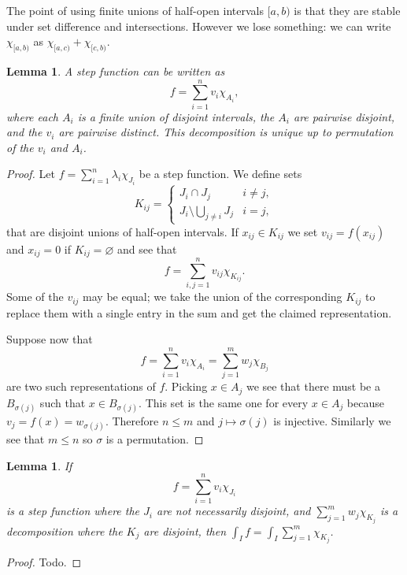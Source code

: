 \documentclass[11pt]{amsart}
\newtheorem{lemm}[theo]{Lemma}
\theoremstyle{definition}
\def\empty{\varnothing}
\begin{document}
The point of using finite unions of half-open intervals $[a,b)$ is that they are stable under set difference and intersections.
However we lose something: we can write $\chi_{[a,b)}$ as $\chi_{[a,c)} + \chi_{[c,b)}$.


\begin{lemm}
A step function can be written as
\[
f = \sum_{i=1}^n v_i \chi_{A_i},
\]
where each $A_i$ is a finite union of disjoint intervals, the $A_i$ are pairwise disjoint, and the $v_i$ are pairwise distinct.
This decomposition is unique up to permutation of the $v_i$ and $A_i$.
\end{lemm}

\begin{proof}
Let $f = \sum_{i=1}^n \lambda_i \chi_{J_i}$ be a step function.
We define sets
\[
K_{ij} = \begin{cases}
J_i \cap J_j & i \not= j,
\\
J_i \setminus \bigcup_{j\not=i} J_j & i = j,
\end{cases}
\]
that are disjoint unions of half-open intervals.
If $x_{ij} \in K_{ij}$ we set $v_{ij} = f(x_{ij})$ and $x_{ij} = 0$ if $K_{ij} = \empty$ and see that
\[
f = \sum_{i,j=1}^n v_{ij} \chi_{K_{ij}}.
\]
Some of the $v_{ij}$ may be equal; we take the union of the corresponding $K_{ij}$ to replace them with a single entry in the sum and get the claimed representation.

Suppose now that
\[
f = \sum_{i=1}^n v_i \chi_{A_i}
= \sum_{j=1}^m w_j \chi_{B_j}
\]
are two such representations of $f$.
Picking $x \in A_j$ we see that there must be a $B_{\sigma(j)}$ such that $x \in B_{\sigma(j)}$.
This set is the same one for every $x \in A_j$ because $v_j = f(x) = w_{\sigma(j)}$.
Therefore $n \leq m$ and $j \mapsto \sigma(j)$ is injective.
Similarly we see that $m \leq n$ so $\sigma$ is a permutation.
\end{proof}



\begin{lemm}
If
\[
f = \sum_{i=1}^n v_i \chi_{J_i}
\]
is a step function where the $J_i$ are not necessarily disjoint, and $\sum_{j=1}^m w_j \chi_{K_j}$ is a decomposition where the $K_j$ are disjoint, then $\int_I f = \int_I \sum_{j=1}^m \chi_{K_j}$.
\end{lemm}

\begin{proof}
Todo.
\end{proof}
\end{document}
